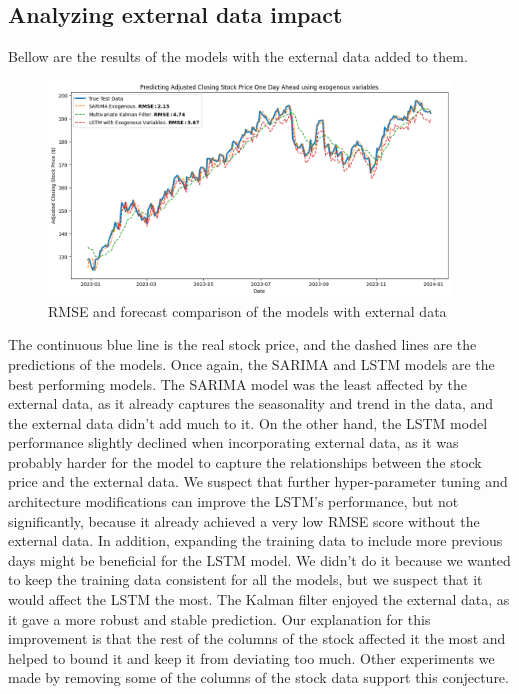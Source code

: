 \documentclass[12pt]{article}
\theoremstyle{definition}
\begin{document}
\subsection{Analyzing external data impact}
Bellow are the results of the models with the external data added to them.

\begin{figure}[H]
  \centering
  \includegraphics[width=0.95\textwidth]{Images/one day ahead exogenous compilation.png}
  \caption{RMSE and forecast comparison of the models with external data}
\end{figure}
The continuous blue line is the real stock price, and the dashed lines are the predictions of the models.
Once again, the SARIMA and LSTM models are the best performing models.
The SARIMA model was the least affected by the external data, as it already captures the seasonality and trend in the data, and the external data didn't add much to it.
On the other hand, the LSTM model performance slightly declined when incorporating external data, as it was probably harder for the model to capture the relationships between the stock price and the external data.
We suspect that further hyper-parameter tuning and architecture modifications can improve the LSTM's performance, but not significantly, because it already achieved a very low RMSE score without the external data.
In addition, expanding the training data to include more previous days might be beneficial for the LSTM model.
We didn't do it because we wanted to keep the training data consistent for all the models, but we suspect that it would affect the LSTM the most.
The Kalman filter enjoyed the external data, as it gave a more robust and stable prediction. 
Our explanation for this improvement is that the rest of the columns of the stock affected it the most and helped to bound it and keep it from deviating too much.
Other experiments we made by removing some of the columns of the stock data support this conjecture.
\end{document}
